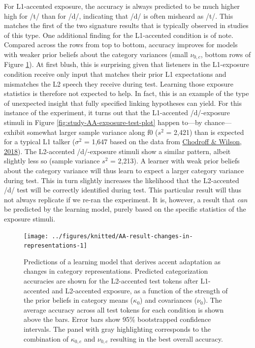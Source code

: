 \documentclass[
  11pt,
  english,
  man,floatsintext]{apa6}
\begin{document}
For L1-accented exposure, the accuracy is always predicted to be much higher high for /t/ than for /d/, indicating that /d/ is often misheard as /t/. This matches the first of the two signature results that is typically observed in studies of this type. One additional finding for the L1-accented condition is of note. Compared across the rows from top to bottom, accuracy improves for models with weaker prior beliefs about the category variances (small \(\nu_{0,c}\), bottom rows of Figure \ref{fig:AA-result-changes-in-representations}). At first blush, this is surprising given that listeners in the L1-exposure condition receive only input that matches their prior L1 expectations and mismatches the L2 speech they receive during test. Learning those exposure statistics is therefore not expected to help. In fact, this is an example of the type of unexpected insight that fully specified linking hypotheses can yield. For this instance of the experiment, it turns out that the L1-accented /d/-exposure stimuli in Figure \ref{fig:study-AA-exposure-test-plot} happen to---by chance---exhibit somewhat larger sample variance along f0 (\(s^2\) = 2,421) than is expected for a typical L1 talker (\(\sigma^2\) = 1,647 based on the data from \protect\hyperlink{ref-chodroff-wilson2018}{Chodroff \& Wilson, 2018}). The L2-accented /d/-exposure stimuli show a similar pattern, albeit slightly less so (sample variance \(s^2\) = 2,213). A learner with weak prior beliefs about the category variance will thus learn to expect a larger category variance during test. This in turn slightly increases the likelihood that the L2-accented /d/ test will be correctly identified during test. This particular result will thus not always replicate if we re-ran the experiment. It is, however, a result that \emph{can} be predicted by the learning model, purely based on the specific statistics of the exposure stimuli.



\begin{figure}

{\centering \texttt{[image: ../figures/knitted/AA-result-changes-in-representations-1]} 

}

\caption{Predictions of a learning model that derives accent adaptation as changes in category representations. Predicted categorization accuracies are shown for the L2-accented test tokens after L1-accented and L2-accented exposure, as a function of the strength of the prior beliefs in category means (\(\kappa_0\)) and covariances (\(\nu_0\)). The average accuracy across all test tokens for each condition is shown above the bars. Error bars show 95\% bootstrapped confidence intervals. The panel with gray highlighting corresponds to the combination of \(\kappa_{0,c}\) and \(\nu_{0,c}\) resulting in the best overall accuracy.}\label{fig:AA-result-changes-in-representations}
\end{figure}
\end{document}
